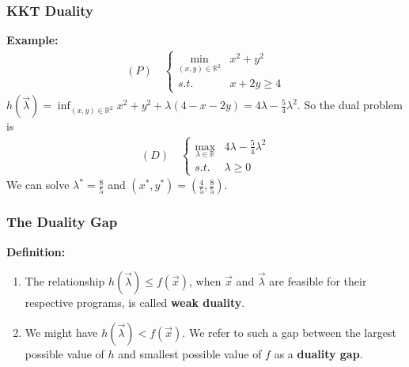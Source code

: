 \documentclass[11pt,a4paper]{article}
\begin{document}
\subsubsection{KKT Duality}
\begin{center}
\end{center}
\textbf{Example:}
\begin{equation}
    \begin{aligned}
        (P)\quad \left\{\begin{matrix}
            \min_{(x,y)\in \mathbb{R}^2}&x^2+y^2\\
            s.t.&x+2y\geq 4
        \end{matrix}\right.
    \end{aligned}
    \nonumber
\end{equation}
$h(\vec{\lambda})=\inf_{(x,y)\in \mathbb{R}^2} x^2+y^2+\lambda (4-x-2y)=4\lambda-\frac{5}{4}\lambda^2$. So the dual problem is
\begin{equation}
    \begin{aligned}
        (D)\quad \left\{\begin{matrix}
            \max_{{\lambda}\in \mathbb{R}}&4\lambda-\frac{5}{4}\lambda^2\\
            s.t.&{\lambda}\geq 0
        \end{matrix}\right.
    \end{aligned}
    \nonumber
\end{equation}
We can solve $\lambda^*=\frac{8}{5}$ and $(x^*,y^*)=\left(\frac{4}{5},\frac{8}{5}\right)$.

\subsubsection{The Duality Gap}
\textbf{Definition:}
\begin{enumerate}
    \item The relationship $h(\vec{\lambda})\leq f(\vec{x})$, when $\vec{x}$ and $\vec{\lambda}$ are feasible for their respective programs, is called \textbf{weak duality}.
    \item We might have $h(\vec{\lambda})< f(\vec{x})$. We refer to such a gap between the largest possible value of $h$ and smallest possible value of $f$ as a \textbf{duality gap}.
\end{enumerate}
\end{document}
